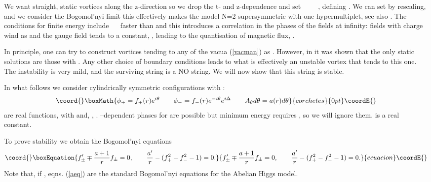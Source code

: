 \documentclass[a4paper,aps,prd,superscriptaddress,floats]{revtex4}
\begin{document}
We want straight, static vortices along the z-direction so we drop the
t- and z-dependence and set~\coordHE{}~\myHighlight{$=$}\coordHE{}~\coordHE{}~\myHighlight{$=$}\coordHE{}~\coordHE{}, defining
\coordHE{}. We can set \coordHE{} by rescaling,
and we consider the Bogomol'nyi limit \coordHE{} {this effectively
makes the model N=2 supersymmetric with one hypermultiplet, see also
\cite{edel,FG98,hou}}.  The conditions for finite energy include
\coordHE{}~\myHighlight{$\to$}\coordHE{}~\coordHE{}  \coordHE{} faster
than \coordHE{} and this introduces a correlation in the phases of the
fields at infinity: fields with charge \coordHE{} wind as \coordHE{} and the gauge field tends to a constant, \coordHE{},
leading to the quantisation of magnetic flux, \coordHE{}.

In principle, one can try to construct vortices tending to any of the
vacua (\ref{vacman}) as \coordHE{}.  However, in \cite{PRTT96} it
was shown that the only static solutions are those with \coordHE{}.  Any
other choice of boundary conditions leads to what is effectively an
unstable vortex that tends to this one. The instability is very mild,
and the surviving string is a NO string. We will now show that this
string is stable.

In what follows we consider cylindrically symmetric configurations
with \coordHE{} :
\[\coord{}\boxMath{
\phi_+ = f_+(r) e^{i\theta} \qquad
\phi_- = f_-(r) e^{-i\theta}e^{i\Delta} \qquad
A_\theta  d\theta= a(r) d\theta 
}{corchetes}{0pt}\coordE{}\]
\coordHE{} are real functions, with  
\coordHE{} and, 
\coordHE{}, \coordHE{}.
 \coordHE{}--dependent phases \coordHE{}
for \myHighlight{$\phi_\pm$}\coordHE{} are possible but 
minimum energy requires 
\coordHE{}, so we will ignore them. 
\myHighlight{$\Delta$}\coordHE{} is a real constant.

To prove stability we obtain the Bogomol'nyi equations
\begin{equation}\coord{}\boxEquation{
f'_\pm \mp \frac{a+1}r f_\pm = 0, \qquad {a'\over r} - (f_+^2 - f_-^2 -1) = 0. \label{aeq} 
}{
f'_\pm \mp \frac{a+1}r f_\pm = 0, \qquad {a'\over r} - (f_+^2 - f_-^2 -1) = 0. }{ecuacion}\coordE{}\end{equation}
Note that, if \coordHE{}, eqns. (\ref{aeq}) are 
the standard Bogomol'nyi  equations for the Abelian Higgs model.
\end{document}
